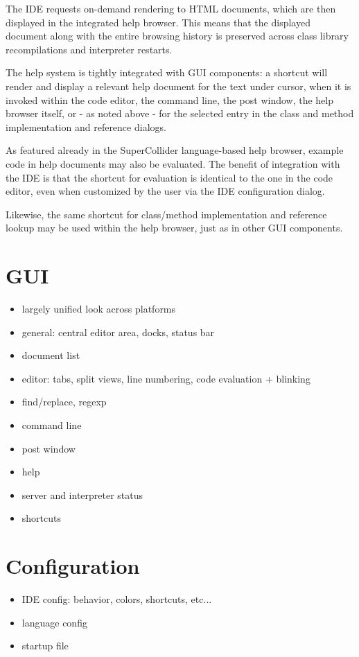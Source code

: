 \documentclass[11pt,a4paper]{article}
\begin{document}
The IDE requests on-demand rendering to HTML documents, which are then displayed in the integrated
help browser. This means that the displayed document along with the entire browsing history is
preserved across class library recompilations and interpreter restarts.

The help system is tightly integrated with GUI components: a shortcut will render and display a
relevant help document for the text under cursor, when it is invoked within the code editor,
the command line, the post window, the help browser itself, or - as noted above - for the selected
entry in the class and method implementation and reference dialogs.

As featured already in the SuperCollider language-based help browser, example code in help documents
may also be evaluated. The benefit of integration with the IDE is that the shortcut for evaluation
is identical to the one in the code editor, even when customized by the user via the IDE
configuration dialog.

Likewise, the same shortcut for class/method implementation and reference lookup may be used within
the help browser, just as in other GUI components.

\section{GUI}

\begin{itemize}
 \item largely unified look across platforms
 \item general: central editor area, docks, status bar
 \item document list
 \item editor: tabs, split views, line numbering, code evaluation + blinking
 \item find/replace, regexp
 \item command line
 \item post window
 \item help
 \item server and interpreter status
 \item shortcuts
\end{itemize}

\section{Configuration}

\begin{itemize}
 \item IDE config: behavior, colors, shortcuts, etc...
 \item language config
 \item startup file
\end{itemize}
\end{document}
